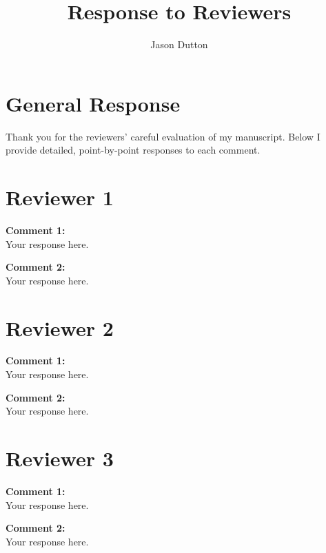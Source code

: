 \documentclass[aip,apl,reprint]{revtex4-2}
\begin{document}
\title{Response to Reviewers}

\author{Jason Dutton}

\maketitle

\section*{General Response}
Thank you for the reviewers' careful evaluation of my manuscript. Below I provide detailed, point-by-point responses to each comment.

\section*{Reviewer 1}
\textbf{Comment 1:} \\
Your response here.

\textbf{Comment 2:} \\
Your response here.

\section*{Reviewer 2}
\textbf{Comment 1:} \\
Your response here.

\textbf{Comment 2:} \\
Your response here.

\section*{Reviewer 3}
\textbf{Comment 1:} \\
Your response here.

\textbf{Comment 2:} \\
Your response here.
\end{document}
